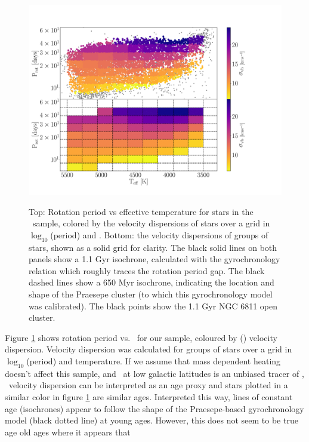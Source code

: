 \begin{figure}
  \caption{
      Top: Rotation period vs effective temperature for stars in the \mct\
    sample, colored by the velocity dispersions of stars over a grid in
    $\log_{10}$(period) and \teff.
    Bottom: the velocity dispersions of groups of stars, shown as a solid
    grid for clarity.
    The black solid lines on both panels show a 1.1 Gyr isochrone, calculated
    with the \citet{angus2019} gyrochronology relation which roughly traces
    the rotation period gap.
    The black dashed lines show a 650 Myr isochrone, indicating the location
    and shape of the Praesepe cluster (to which this gyrochronology model was
    calibrated).
    The black points show the 1.1 Gyr NGC 6811 open cluster.
}
  \centering
    \includegraphics[width=1\textwidth]{vplot}
\label{fig:dispersion_period_teff}
\end{figure}
Figure \ref{fig:dispersion_period_teff} shows rotation period vs. \teff\ for
our sample, coloured by (\vb) velocity dispersion.
Velocity dispersion was calculated for groups of stars over a grid in
$\log_{10}$(period) and temperature.
If we assume that mass dependent heating doesn't affect this sample, and \vb\
at low galactic latitudes is an unbiased tracer of \vz, \vb\ velocity
dispersion can be interpreted as an age proxy and stars plotted in a similar
color in figure \ref{fig:dispersion_period_teff} are similar ages.
Interpreted this way, lines of constant age (isochrones) appear to follow the
shape of the Praesepe-based gyrochronology model (black dotted line) at young
ages.
However, this does not seem to be true age old ages where it appears that
